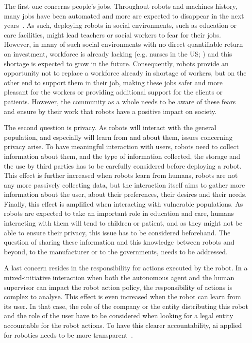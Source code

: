 The first one concerns people's jobs. Throughout robots and machines history, many jobs have been automated and more are expected to disappear in the next years~\citep{frey2017future}. As such, deploying robots in social environments, such as education or care facilities, might lead teachers or social workers to fear for their jobs. However, in many of such social environments with no direct quantifiable return on investment, workforce is already lacking (e.g. nurses in the US; \citealt{nevidjon2001nursing}) and this shortage is expected to grow in the future. Consequently, robots provide an opportunity not to replace a workforce already in shortage of workers, but on the other end to support them in their job, making these jobs safer and more pleasant for the workers or providing additional support for the clients or patients. However, the community as a whole needs to be aware of these fears and ensure by their work that robots have a positive impact on society.

The second question is privacy. As robots will interact with the general population, and especially will learn from and about them, issues concerning privacy arise. To have meaningful interaction with users, robots need to collect information about them, and the type of information collected, the storage and the use by third parties has to be carefully considered before deploying a robot. This effect is further increased when robots learn from humans, robots are not any more passively collecting data, but the interaction itself aims to gather more information about the user, about their preferences, their desires and their needs. Finally, this effect is amplified when interacting with vulnerable populations. As robots are expected to take an important role in education and care, humans interacting with them will tend to children or patient, and as they might not be able to ensure their privacy, this issue has to be considered beforehand. The question of sharing these information and this knowledge between robots and beyond, to the manufacturer or to the governments, needs to be addressed.

A last concern resides in the responsibility for actions executed by the robot. In a mixed-initiative interaction when both the autonomous agent and the human supervisor can impact the robot action policy, the responsibility of actions is complex to analyse. This effect is even increased when the robot can learn from its user. In that case, the role of the company or the entity distributing this robot and the role of the user have to be considered when looking for a legal entity accountable for the robot actions. To have this clearer accountability, \gls{ai} applied for robotics needs to be more transparent~\citep{wachter2017transparent}.


